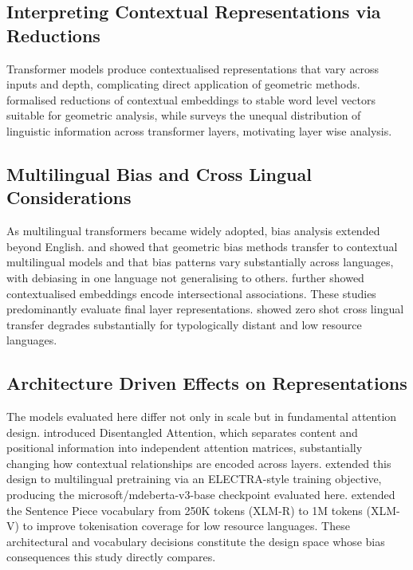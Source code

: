 \documentclass[english, a4paper, 11.5pt, twoside]{article}
\begin{document}
\subsection{Interpreting Contextual Representations via Reductions}
Transformer models produce contextualised representations that vary across inputs and depth, complicating direct application of geometric methods. \textcite{Bommasani:2020} formalised reductions of contextual embeddings to stable word level vectors suitable for geometric analysis, while \textcite{Rogers:2020} surveys the unequal distribution of linguistic information across transformer layers, motivating layer wise analysis.

\subsection{Multilingual Bias and Cross Lingual Considerations}
As multilingual transformers became widely adopted, bias analysis extended beyond English. \textcite{Zhao:2019} and \textcite{Zhao:2020} showed that geometric bias methods transfer to contextual multilingual models and that bias patterns vary substantially across languages, with debiasing in one language not generalising to others. \textcite{Guo:2021} further showed contextualised embeddings encode intersectional associations. These studies predominantly evaluate final layer representations. \textcite{Lauscher:2020}
showed zero shot cross lingual transfer degrades substantially for typologically distant and low resource languages. 


\subsection{Architecture Driven Effects on Representations}
The models evaluated here differ not only in scale but in fundamental attention design. \textcite{He:2021} introduced Disentangled Attention, which separates content and positional information into independent attention matrices, substantially changing how contextual relationships are encoded across layers. \textcite{He:2023} extended this design to multilingual pretraining via an ELECTRA-style training objective, producing the microsoft/mdeberta-v3-base checkpoint evaluated here. \textcite{Liang:2023} extended the Sentence Piece vocabulary from 250K tokens (XLM-R) to 1M tokens (XLM-V) to improve tokenisation coverage for
low resource languages. These architectural and vocabulary decisions constitute the design space whose bias consequences this study directly compares.
\end{document}
